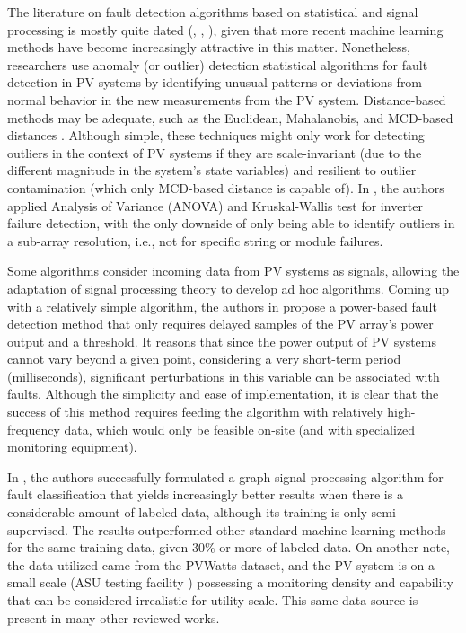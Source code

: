 The literature on fault detection algorithms based on statistical and signal processing is mostly quite dated (\cite{Buddha2012}, \cite{Zhao2014}, \cite{Vergura2008}), given that more recent machine learning methods have become increasingly attractive in this matter. Nonetheless, researchers use anomaly (or outlier) detection statistical algorithms for fault detection in PV systems by identifying unusual patterns or deviations from normal behavior in the new measurements from the PV system. Distance-based methods may be adequate, such as the Euclidean, Mahalanobis, and MCD-based distances \cite{Braun2011}. Although simple, these techniques might only work for detecting outliers in the context of PV systems if they are scale-invariant (due to the different magnitude in the system's state variables) and resilient to outlier contamination (which only MCD-based distance is capable of). In \cite{Vergura2008}, the authors applied Analysis of Variance (ANOVA) and Kruskal-Wallis test for inverter failure detection, with the only downside of only being able to identify outliers in a sub-array resolution, i.e., not for specific string or module failures.

Some algorithms consider incoming data from PV systems as signals, allowing the adaptation of signal processing theory to develop ad hoc algorithms. Coming up with a relatively simple algorithm, the authors in \cite{Iles2021} propose a power-based fault detection method that only requires delayed samples of the PV array's power output and a threshold. It reasons that since the power output of PV systems cannot vary beyond a given point, considering a very short-term period (milliseconds), significant perturbations in this variable can be associated with faults. Although the simplicity and ease of implementation, it is clear that the success of this method requires feeding the algorithm with relatively high-frequency data, which would only be feasible on-site (and with specialized monitoring equipment).

In \cite{Fan2020}, the authors successfully formulated a graph signal processing algorithm for fault classification that yields increasingly better results when there is a considerable amount of labeled data, although its training is only semi-supervised. The results outperformed other standard machine learning methods for the same training data, given 30\% or more of labeled data. On another note, the data utilized came from the PVWatts \cite{Dobos2013} dataset, and the PV system is on a small scale (ASU testing facility \cite{Rao2016}) possessing a monitoring density and capability that can be considered irrealistic for utility-scale. This same data source is present in many other reviewed works.

